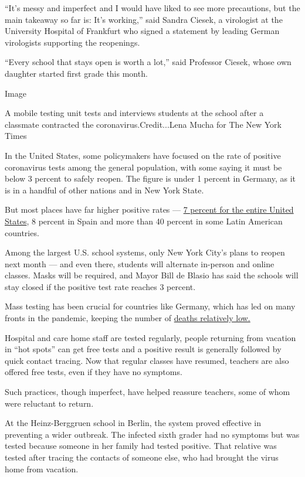 ``It's messy and imperfect and I would have liked to see more
precautions, but the main takeaway so far is: It's working,'' said
Sandra Ciesek, a virologist at the University Hospital of Frankfurt who
signed a statement by leading German virologists supporting the
reopenings.

``Every school that stays open is worth a lot,'' said Professor Ciesek,
whose own daughter started first grade this month.

Image

A mobile testing unit tests and interviews students at the school after
a classmate contracted the coronavirus.Credit...Lena Mucha for The New
York Times

In the United States, some policymakers have focused on the rate of
positive coronavirus tests among the general population, with some
saying it must be below 3 percent to safely reopen. The figure is under
1 percent in Germany, as it is in a handful of other nations and in New
York State.

But most places have far higher positive rates ---
\href{https://www.nytimes3xbfgragh.onion/interactive/2020/us/coronavirus-testing.html}{7
percent for the entire United States}, 8 percent in Spain and more than
40 percent in some Latin American countries.

Among the largest U.S. school systems, only New York City's plans to
reopen next month --- and even there, students will alternate in-person
and online classes. Masks will be required, and Mayor Bill de Blasio has
said the schools will stay closed if the positive test rate reaches 3
percent.

Mass testing has been crucial for countries like Germany, which has led
on many fronts in the pandemic, keeping the number of
\href{https://www.nytimes3xbfgragh.onion/2020/04/04/world/europe/germany-coronavirus-death-rate.html}{deaths
relatively low.}

Hospital and care home staff are tested regularly, people returning from
vacation in ``hot spots'' can get free tests and a positive result is
generally followed by quick contact tracing. Now that regular classes
have resumed, teachers are also offered free tests, even if they have no
symptoms.

Such practices, though imperfect, have helped reassure teachers, some of
whom were reluctant to return.

At the Heinz-Berggruen school in Berlin, the system proved effective in
preventing a wider outbreak. The infected sixth grader had no symptoms
but was tested because someone in her family had tested positive. That
relative was tested after tracing the contacts of someone else, who had
brought the virus home from vacation.

